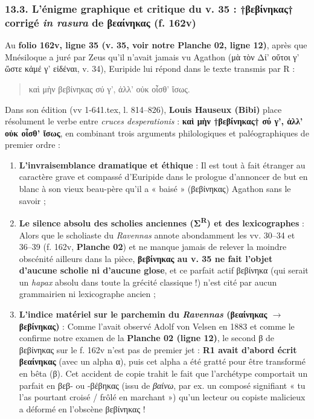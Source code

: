 \documentclass[11pt, a4paper, twoside]{article}
\renewcommand{\_}{\origunderscore\penalty0\relax}
\renewcommand{\texttt}[1]{#1}
\newcommand{\R}{\textbf{R}}
\newcommand{\Run}{\textbf{R}\textsuperscript{1}}
\newcommand{\Bibi}{\textit{Bibi}}
\def\R{R}%
\def\Run{R1}%
\def\Bibi{Bibi}%
\begin{document}
\subsubsection{13.3. L'énigme graphique et critique du v. 35 : \texttt{†βεβίνηκας†} corrigé \textit{in rasura} de \texttt{βεαίνηκας} (\texttt{f. 162v})}

Au \textbf{folio \texttt{162v}, ligne 35 (v. 35, voir notre Planche 02, ligne 12)}, après que Mnésiloque a juré par Zeus qu'il n'avait jamais vu Agathon (\texttt{μὰ τὸν Δί' οὔτοι γ' ὥστε κἀμέ γ' εἰδέναι}, v. 34), Euripide lui répond dans le texte transmis par \R{} :
\begin{quote}
\texttt{καὶ μὴν βεβίνηκας σύ γ', ἀλλ' οὐκ οἶσθ' ἴσως.}\\
\end{quote}

Dans son édition (\texttt{vv 1-641.tex}, l. 814–826), \textbf{Louis Hauseux (\Bibi{})} place résolument le verbe entre \textit{cruces desperationis} : \textbf{\texttt{καὶ μὴν †βεβίνηκας† σύ γ', ἀλλ' οὐκ οἶσθ' ἴσως}}, en combinant trois arguments philologiques et paléographiques de premier ordre :
\begin{enumerate}[leftmargin=1.6em, itemsep=2pt]
  \item \textbf{L'invraisemblance dramatique et éthique} : Il est tout à fait étranger au caractère grave et compassé d'Euripide dans le prologue d'annoncer de but en blanc à son vieux beau-père qu'il a « baisé » (\texttt{βεβίνηκας}) Agathon sans le savoir ;
  \item \textbf{Le silence absolu des scholies anciennes (Σ\textsuperscript{R}) et des lexicographes} : Alors que le scholiaste du \textit{Ravennas} annote abondamment les vv. 30–34 et 36–39 (\texttt{f. 162v}, \textbf{Planche 02}) et ne manque jamais de relever la moindre obscénité ailleurs dans la pièce, \textbf{\texttt{βεβίνηκας} au v. 35 ne fait l'objet d'aucune scholie ni d'aucune glose}, et ce parfait actif \texttt{βεβίνηκα} (qui serait un \textit{hapax} absolu dans toute la grécité classique !) n'est cité par aucun grammairien ni lexicographe ancien ;
  \item \textbf{L'indice matériel sur le parchemin du \textit{Ravennas} (\texttt{βεαίνηκας} $\to$ \texttt{βεβίνηκας})} : Comme l'avait observé Adolf von Velsen en 1883 et comme le confirme notre examen de la \textbf{Planche 02 (ligne 12)}, le second β de \texttt{βεβίνηκας} sur le \texttt{f. 162v} n'est pas de premier jet : \textbf{\Run{} avait d'abord écrit \texttt{βεαίνηκας}} (avec un alpha α), puis cet alpha a été gratté pour être transformé en bêta (β). Cet accident de copie trahit le fait que l'archétype comportait un parfait en \texttt{βεβ-} ou \texttt{-βέβηκας} (issu de \textit{βαίνω}, par ex. un composé signifiant « tu l'as pourtant croisé / frôlé en marchant ») qu'un lecteur ou copiste malicieux a déformé en l'obscène \texttt{βεβίνηκας} !
\end{enumerate}
\end{document}
